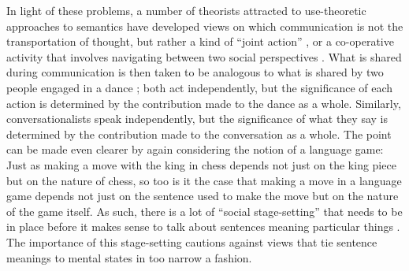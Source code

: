 In light of these problems, a number of theorists attracted to use-theoretic approaches to semantics have developed views on which communication is not the transportation of thought, but rather a kind of ``joint action'' \citep{Clark:1996}, or a co-operative activity that involves navigating between two social perspectives \citep{Brandom:1994}. What is shared during communication is then taken to be analogous to what is shared by two people engaged in a dance \citep{Clark:1996,Brandom:2010a}; both act independently, but the significance of each action is determined by the contribution made to the dance as a whole. Similarly, conversationalists speak independently, but the significance of what they say is determined by the contribution made to the conversation as a whole. The point can be made even clearer by again considering the notion of a language game: Just as making a move with the king in chess depends not just on the king piece but on the nature of chess, so too is it the case that making a move in a language game depends not just on the sentence used to make the move but on the nature of the game itself. As such, there is a lot of ``social stage-setting'' that needs to be in place before it makes sense to talk about sentences meaning particular things \citep[][p. 461]{Brandom:1994}. The importance of this stage-setting cautions against views that tie sentence meanings to mental states in too narrow a fashion. 

